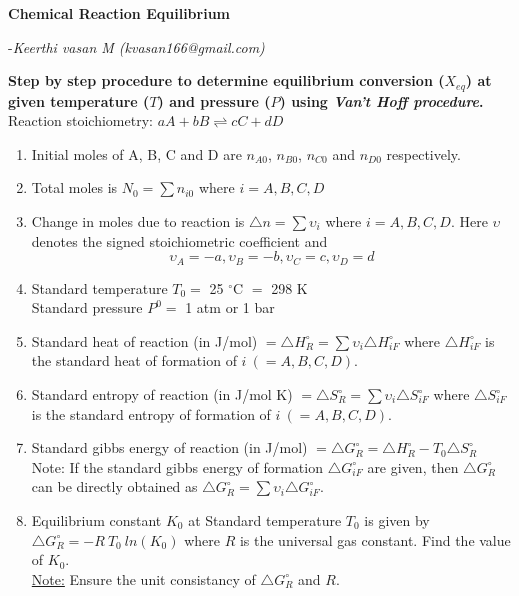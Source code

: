 \documentclass[a4paper,10pt]{article}
\begin{document}
\centering\textbf{\Large Chemical Reaction Equilibrium}\begin{flushright} -\textit{Keerthi vasan M (kvasan166@gmail.com)} \end{flushright} \textbf{Step by step procedure to determine equilibrium conversion ($X_{eq}$) at given temperature ($T$) and pressure ($P$) using \emph{Van't Hoff procedure}.}\\[0.5 cm]
Reaction stoichiometry: $a A + b B \rightleftharpoons c C + d D$\\
\begin{enumerate}
    \item Initial moles of A, B, C and D are $n_{A0}$, $n_{B0}$, $n_{C0}$ and $n_{D0}$ respectively.
    
    \item Total moles is $N_0 = \sum n_{i0}$ where $i = A,B,C,D$
    
    \item Change in moles due to reaction is $\triangle n = \sum \upsilon_i$ where $i = A,B,C,D$. Here $\upsilon$ denotes the signed stoichiometric coefficient and $$\upsilon_A=-a, \upsilon_B=-b, \upsilon_C=c, \upsilon_D=d$$
    
    \item Standard temperature $T_0 = $ 25 $^{\circ}$C $=$ 298 K\\Standard pressure  $P^0 = $ 1 atm or 1 bar
    
    \item Standard heat of reaction (in J/mol) $= \triangle H_R^{\circ} = \sum \upsilon_i \triangle H_{iF}^{\circ}$ where $\triangle H_{iF}^{\circ}$ is the standard heat of formation of $i \ (=A,B,C,D)$. 
    
    \item Standard entropy of reaction (in J/mol K) $= \triangle S_R^{\circ} = \sum \upsilon_i \triangle S_{iF}^{\circ}$ where $\triangle S_{iF}^{\circ}$ is the standard entropy of formation of $i \ (=A,B,C,D)$. 
    
    \item Standard gibbs energy of reaction (in J/mol) $= \triangle G_R^{\circ}=\triangle H_R^{\circ}-T_0 \triangle S_R^{\circ}$\\Note: If the standard gibbs energy of formation $\triangle G_{iF}^{\circ}$ are given, then $\triangle G_R^{\circ}$ can be directly obtained as $\triangle G_R^{\circ} = \sum \upsilon_i \triangle G_{iF}^{\circ}$.
    
    \item Equilibrium constant $K_0$ at Standard temperature $T_0$ is given by $\triangle G_R^{\circ} = - R\ T_0\ ln(K_0)$ where $R$ is the universal gas constant. Find the value of $K_0$. \\\underline{Note:} Ensure the unit consistancy of $\triangle G_R^{\circ}$ and $R$.
    

\end{enumerate}
\end{document}
